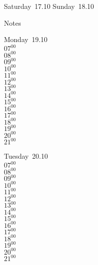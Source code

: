 \documentclass[11pt,a4paper]{book}\usepackage[]{graphicx}\usepackage[]{color}
\begin{document}
\begin{weekendbox}
  Saturday~17.10
  \tcblower
  Sunday~18.10
\end{weekendbox} %
\begin{notebox}
  Notes
\end{notebox}
\clearpage
\begin{headerbox}
\end{headerbox}
\begin{weekdaybox}
  Monday~19.10\\
  { 
  \vfill
  $07^{00}$\\
$08^{00}$\\
$09^{00}$\\
$10^{00}$\\
$11^{00}$\\
$12^{00}$\\
$13^{00}$\\
$14^{00}$\\
$15^{00}$\\
$16^{00}$\\
$17^{00}$\\
$18^{00}$\\
$19^{00}$\\
$20^{00}$\\
$21^{00}$\\
  }
\end{weekdaybox}
\begin{weekdaybox}
  Tuesday~20.10\\
  { 
  \vfill
  $07^{00}$\\
$08^{00}$\\
$09^{00}$\\
$10^{00}$\\
$11^{00}$\\
$12^{00}$\\
$13^{00}$\\
$14^{00}$\\
$15^{00}$\\
$16^{00}$\\
$17^{00}$\\
$18^{00}$\\
$19^{00}$\\
$20^{00}$\\
$21^{00}$\\
  }
\end{weekdaybox}
\end{document}

